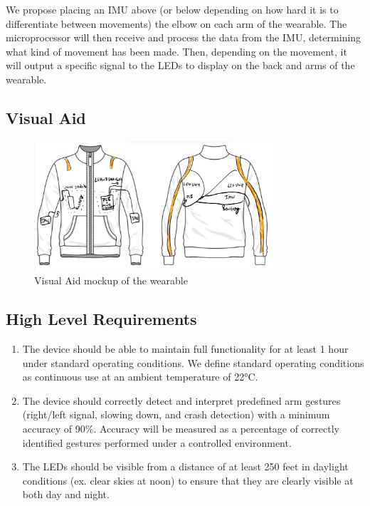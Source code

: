 \documentclass[12pt]{article}
\begin{document}
We propose placing an IMU above (or below depending on how hard 
it is to differentiate between movements) the elbow on each arm 
of the wearable. The microprocessor will then receive and process 
the data from the IMU, determining what kind of movement has been 
made. Then, depending on the movement, it will output a specific 
signal to the LEDs to display on the back and arms of the wearable. 

\newpage
\subsection{Visual Aid}
\begin{figure}[ht]
    \centering
    \includegraphics[width=0.8\textwidth]{visual_aid.jpg}
    \caption{Visual Aid mockup of the wearable}
    \label{fig:my_label}
\end{figure}
\subsection{High Level Requirements}
\begin{enumerate}
    \item The device should be able to maintain full functionality 
    for at least 1 hour under standard operating conditions. 
    We define standard operating conditions as continuous use 
    at an ambient temperature of 22°C. 

    \item The device should correctly detect and interpret 
    predefined arm gestures (right/left signal, slowing down, and 
    crash detection) with a minimum accuracy of 90\%. Accuracy 
    will be measured as a percentage of correctly identified 
    gestures performed under a controlled environment. 
    \item The LEDs should be visible from a distance of at least 
    250 feet in daylight conditions (ex. clear skies at noon) to ensure that they are clearly visible at both day and night. 

\end{enumerate}
\end{document}
